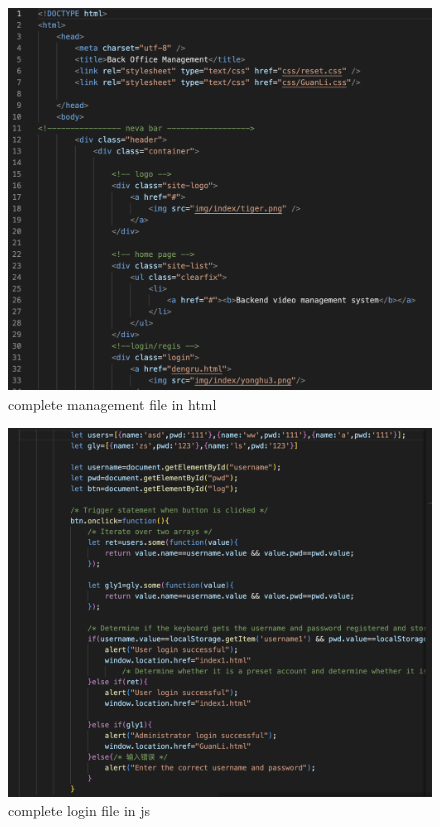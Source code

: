 \documentclass[a4paper, 11pt]{report}
\begin{document}
\begin{figure}
\includegraphics[width=1\linewidth]{management file htaml.png}
\caption{\label{management file htaml.png}complete management file in html}
\end{figure}

\begin{figure}
\includegraphics[width=1\linewidth]{login file javascript.png}
\caption{\label{login file javascript.png}complete login file in js}
\end{figure}
\end{document}
